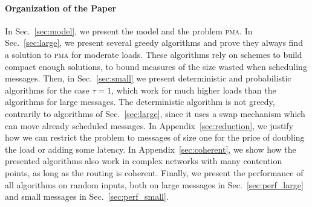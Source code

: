 \documentclass[a4paper,UKenglish,cleveref, autoref, thm-restate]{lipics-v2019}
\newcommand\pma{\textsc{pma}\xspace}
\begin{document}
\paragraph*{Organization of the Paper}

In Sec.~\ref{sec:model}, we present the model and the problem \pma. In Sec.~\ref{sec:large},
we present several greedy algorithms and prove they always find a solution to \pma for moderate loads. 
These algorithms rely on schemes to build compact enough solutions, to bound measures of the size wasted when scheduling messages. Then, in Sec.~\ref{sec:small} we present deterministic and probabilistic algorithms for the case $\tau = 1$, which work for much higher loads than the algorithms for large messages. The deterministic algorithm is not greedy, contrarily to algorithms of Sec.~\ref{sec:large}, since it uses a swap mechanism which can move already scheduled messages. 
 In Appendix~\ref{sec:reduction}, we justify how we can restrict the problem to messages of size one for the price of doubling the load or adding some latency. 
 In Appendix~\ref{sec:coherent}, we show how the presented algorithms also work in complex networks with many contention points, as long as the routing is coherent. Finally, we present the performance of all algorithms on random inputs, both on large messages in Sec.~\ref{sec:perf_large} and small messages in Sec.~\ref{sec:perf_small}.
\end{document}
